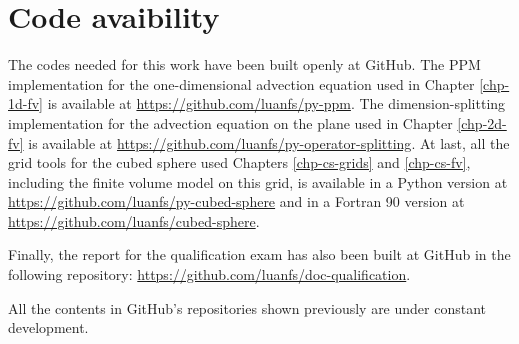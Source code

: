 \chapter{Code avaibility}
\label{anexo-code}

The codes needed for this work have been built openly at GitHub. 
The PPM implementation for the one-dimensional advection equation used in Chapter 
\ref{chp-1d-fv} is available at \url{https://github.com/luanfs/py-ppm}.
The dimension-splitting implementation for the advection equation on the plane used in 
Chapter \ref{chp-2d-fv} is available at \url{https://github.com/luanfs/py-operator-splitting}.
At last, all the grid tools for the cubed sphere used Chapters \ref{chp-cs-grids} and \ref{chp-cs-fv},
including the finite volume model on this grid, is available in a Python version 
at \url{https://github.com/luanfs/py-cubed-sphere} and in a Fortran 90 version at
\url{https://github.com/luanfs/cubed-sphere}.

Finally, the report for the qualification exam has also been built at  GitHub in the following  repository:
\url{https://github.com/luanfs/doc-qualification}.

All the contents in GitHub's repositories shown previously are under constant development.

